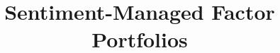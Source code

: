\documentclass[a4paper, 11pt, oneside]{Thesis}  %
\begin{document}
\frontmatter      %

\title  {Sentiment-Managed Factor Portfolios}



\maketitle


\fancyhead{}  %
\rhead{\thepage}  %
\lhead{}  %

\pagestyle{fancy}  %






\end{document}
